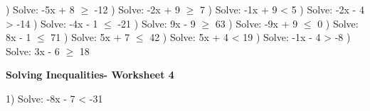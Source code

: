 \documentclass{article}%
\begin{document}
\newline%
) Solve: -5x + 8 $\geq$ -12%
\newline%
\newline%
) Solve: -2x + 9 $\geq$ 7%
\newline%
\newline%
) Solve: -1x + 9 < 5%
\newline%
\newline%
) Solve: -2x - 4 > -14%
\newline%
\newline%
) Solve: -4x - 1 $\leq$ -21%
\newline%
\newline%
) Solve: 9x - 9 $\geq$ 63%
\newline%
\newline%
) Solve: -9x + 9 $\leq$ 0%
\newline%
\newline%
) Solve: 8x - 1 $\leq$ 71%
\newline%
\newline%
) Solve: 5x + 7 $\leq$ 42%
\newline%
\newline%
) Solve: 5x + 4 < 19%
\newline%
\newline%
) Solve: -1x - 4 > -8%
\newline%
\newline%
) Solve: 3x - 6 $\geq$ 18%
\newline%
\newline%
\newline%
\pagebreak%
\large%
\begin{center}%
\textbf{Solving Inequalities- Worksheet 4}%
\newline%
\newline%
\newline%
\end{center} \normalsize%
1) Solve: -8x - 7 < -31%
\newline%
\end{document}
